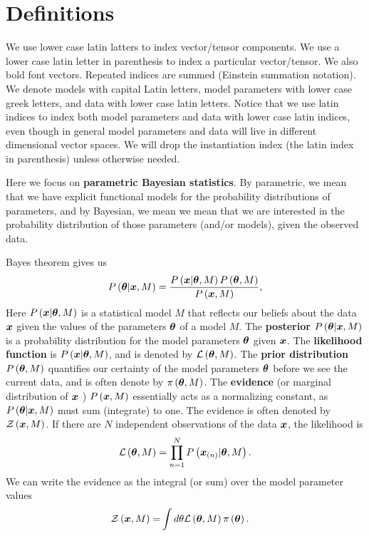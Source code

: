 \section{Definitions}

We use lower case latin latters to index vector/tensor components. 
We use a lower case latin letter in parenthesis to index a particular
vector/tensor. We also bold font vectors. 
Repeated indices are summed (Einstein summation notation). 
We denote models with capital Latin letters, model parameters with
lower case greek letters, and data with lower case latin letters.
Notice that we use latin indices to index both model parameters
and data with lower case latin indices, even though in general model
parameters and data will live in different dimensional vector spaces.
We will drop the instantiation index (the latin index in parenthesis)
unless otherwise needed.  

Here we focus on \textbf{parametric Bayesian statistics}. 
By parametric, we mean that we have explicit functional models for the
probability distributions of parameters, and by Bayesian, we mean we mean
that we are interested in the probability distribution of those parameters
(and/or models), given the observed data.

Bayes theorem gives us
\begin{align}
    \label{eq:Bayes-theorem}
    P\left({\bm \theta}|{\bm x},M\right)
    =
    \frac{
        P\left({\bm x}|{\bm \theta},M\right)P\left({\bm \theta},M\right)
    }{
        P\left({\bm x},M\right)
    }
    ,
\end{align}
Here $P\left({\bm x}|{\bm \theta},M\right)$ is a statistical model $M$ 
that reflects our beliefs about the data ${\bm x}$ given the values of the
parameters ${\bm \theta}$ of a model $M$.
The \textbf{posterior} $P\left({\bm \theta}|{\bm x},M\right)$ is a probability distribution
for the model parameters ${\bm \theta}$ given ${\bm x}$.
The \textbf{likelihood function} is $P\left({\bm x}|{\bm \theta},M\right)$, and  
is denoted by $\mathcal{L}\left({\bm \theta},M\right)$.
The \textbf{prior distribution} $P\left({\bm \theta},M\right)$ quantifies our certainty
of the model parameters ${\bm \theta}$ before we see the current data, and is often
denote by $\pi\left({\bm \theta},M\right)$.
The \textbf{evidence} \cite{skilling-nested-sampling} 
(or marginal distribution of ${\bm x}$ \cite{wasserman2010statistics})
$P\left({\bm x},M\right)$ essentially acts as a normalizing
constant, as $P\left({\bm \theta}|{\bm x},M\right)$ must sum (integrate) to one. 
The evidence is often denoted by $\mathcal{Z}\left({\bm x},M\right)$.
If there are $N$ independent observations of the data ${\bm x}$, the likelihood is
\begin{align}
    \label{eq:likelihood}
    \mathcal{L}\left({\bm \theta},M\right)
    =
    \prod_{n=1}^N P\left({\bm x}_{(n)}|{\bm \theta},M\right)
    .
\end{align}
We can write the evidence as the integral (or sum) over the model parameter values
\begin{align}
    \label{eq:evidence-as-marginalization}
    \mathcal{Z}\left({\bm x},M\right)
    =&
    \int d\theta\mathcal{L}\left({\bm \theta},M\right)\pi\left({\bm \theta}\right) 
    .
\end{align}

